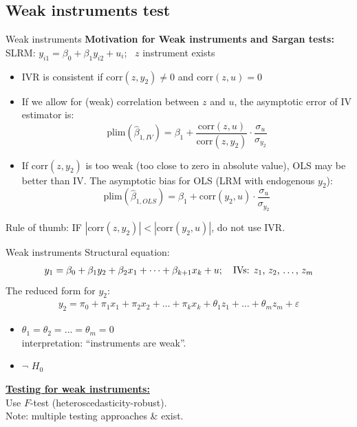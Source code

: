 \documentclass[usenames,dvipsnames]{beamer}
\begin{document}
\subsection{Weak instruments test}
\begin{frame}{Weak instruments}
\textbf{Motivation for Weak instruments and Sargan tests:} \\
\medskip
SLRM: \quad $y_{i1}=\beta_0+\beta_1 y_{i2}+u_i$; \ $z$ instrument exists
\bigskip
\begin{itemize}
\item IVR is consistent if $\mathrm{corr}(z,y_2) \neq 0$ and $\mathrm{corr}(z, u) = 0$
\item If we allow for (weak) correlation between $z$ and $u$, the asymptotic error of IV estimator is:
\small $$\mathrm{plim}(\hat{\beta}_{1, IV}) = \beta_1 + \frac{\mathrm{corr}(z,u)}{\mathrm{corr}(z,y_2)} \cdot \frac{\sigma_u}{\sigma_{y_2}} $$
\item If $\mathrm{corr}(z, y_2)$ is too weak (too close to zero in absolute value), OLS may be better than IV. The asymptotic bias for OLS (LRM with endogenous $y_2$):
\small $$\mathrm{plim}(\hat{\beta}_{1,OLS})=\beta_1+\mathrm{corr}(y_2,u) \cdot \frac{\sigma_u}{\sigma_{y_2}}$$
\end{itemize}
Rule of thumb: IF $|\mathrm{corr}(z,y_2)| < |\mathrm{corr}(y_2,u)|$, do not use IVR.
\end{frame}
\begin{frame}{Weak instruments}
Structural equation: 
\begin{align*}
y_1=\beta_0+\beta_1 y_2 + \beta_2 x_1 + \dots + \beta_{k+1} x_k + u; \quad \text{IVs: $z_1$, $z_2$, \dots , $z_m$}
\end{align*}
The reduced form for $y_2$: 
\begin{align*}
y_2=\pi_0 + \pi_1 x_1 + \pi_2 x_2 + \dots + \pi_k x_k + \theta_1 z_1 + \dots + \theta_m z_m + \varepsilon
\end{align*}
\vspace{-0.3cm}
\begin{itemize}
\item[$H_0$:] $\theta_1=\theta_2=\dots=\theta_m=0$ \\interpretation: ``instruments are weak''.
\item[$H_1$:] $\neg$ $H_0$
\end{itemize}
\bigskip
\textbf{\underline{Testing for weak instruments:}} \\
\medskip
Use $F$-test (heteroscedasticity-robust). \\Note: multiple testing approaches \& exist.
\end{frame}
\end{document}
